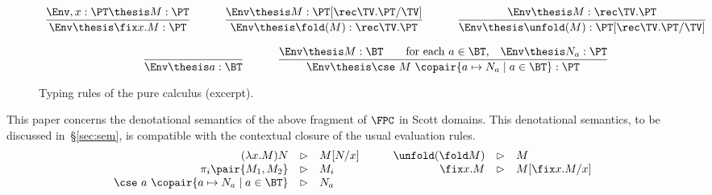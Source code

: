 \begin{figure}[t!]
\[
\begin{array}{c}
\dfrac{\Env,x:\PT \thesis M : \PT}
  {\Env \thesis \fix x.M : \PT}
\qquad\quad

\dfrac{\Env \thesis M : \PT[\rec\TV.\PT/\TV]}
  {\Env \thesis \fold(M) : \rec\TV.\PT}

\qquad\quad

\dfrac{\Env \thesis M : \rec\TV.\PT}
  {\Env \thesis \unfold(M) : \PT[\rec\TV.\PT/\TV]}

\\\\

\dfrac{}
  {\Env \thesis a : \BT}

\qquad\quad

\dfrac{ \Env \thesis M : \BT
  \qquad\text{for each $a \in \BT$,\quad} \Env \thesis N_a : \PT}
  {\Env \thesis \cse\ M\ \copair{a \mapsto N_a \mid a \in \BT} : \PT}

\end{array}
\]
\caption{Typing rules of the pure calculus (excerpt).%
\label{fig:reft:puretyping}}
\end{figure}

\begin{full}
\begin{remark*} %
This paper concerns the denotational semantics
of the above fragment of $\FPC$ in %
Scott domains.
This denotational semantics, to be discussed in~\S\ref{sec:sem},
is compatible with the contextual closure of the %
usual evaluation rules.
\[
\begin{array}{r c l !{\qquad} r c l}
  (\lambda x.M)N
& \rhd
& M[N/x]

& \unfold(\fold M)
& \rhd
& M
\\

  \pi_i \pair{M_1,M_2}
& \rhd
& M_i

& \fix x.M
& \rhd
& M[\fix x.M/x]
\\

  \cse\ a\ \copair{a \mapsto N_a \mid a \in \BT}
& \rhd
&  N_a
\end{array}
\]
\end{remark*}
\end{full}

